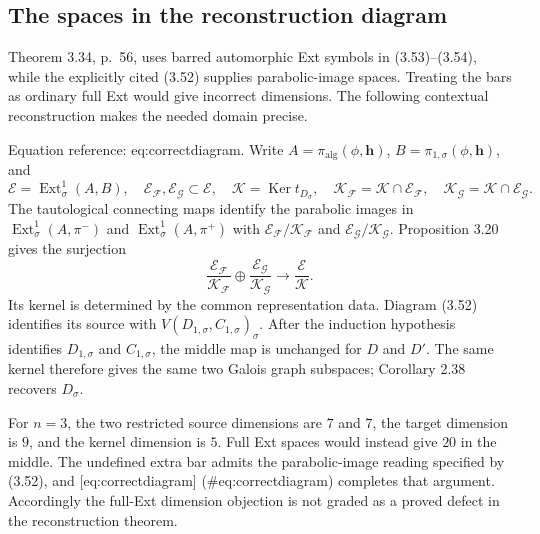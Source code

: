 \documentclass[10pt]{article}
\begin{document}
\subsection*{The spaces in the reconstruction diagram}
Theorem 3.34, p. 56, uses barred automorphic Ext symbols in (3.53)–(3.54), while the explicitly cited (3.52) supplies parabolic-image spaces. Treating the bars as ordinary full Ext would give incorrect dimensions. The following contextual reconstruction makes the needed domain precise.\par
Equation reference: eq:correctdiagram. Write \(A=\pi_{\mathrm{alg}}(\phi,\mathbf h)\), \(B=\pi_{1,\sigma}(\phi,\mathbf h)\), and \[\mathcal E=\operatorname{Ext}^1_\sigma(A,B),\quad
 \mathcal E_{\mathcal F},\mathcal E_{\mathcal G}\subset\mathcal E,\quad
 \mathcal K=\operatorname{Ker}t_{D_\sigma},\quad
 \mathcal K_{\mathcal F}=\mathcal K\cap\mathcal E_{\mathcal F},
 \quad
 \mathcal K_{\mathcal G}=\mathcal K\cap\mathcal E_{\mathcal G}.\] The tautological connecting maps identify the parabolic images in \(\operatorname{Ext}^1_\sigma(A,\pi^-)\) and \(\operatorname{Ext}^1_\sigma(A,\pi^+)\) with \(\mathcal E_{\mathcal F}/\mathcal K_{\mathcal F}\) and \(\mathcal E_{\mathcal G}/\mathcal K_{\mathcal G}\). Proposition 3.20 gives the surjection \[
 \frac{\mathcal E_{\mathcal F}}{\mathcal K_{\mathcal F}}
 \oplus
 \frac{\mathcal E_{\mathcal G}}{\mathcal K_{\mathcal G}}
 \longrightarrow\frac{\mathcal E}{\mathcal K}.\] Its kernel is determined by the common representation data. Diagram (3.52) identifies its source with \(V(D_{1,\sigma},C_{1,\sigma})_\sigma\). After the induction hypothesis identifies \(D_{1,\sigma}\) and \(C_{1,\sigma}\), the middle map is unchanged for \(D\) and \(D'\). The same kernel therefore gives the same two Galois graph subspaces; Corollary 2.38 recovers \(D_\sigma\).\par
For \(n=3\), the two restricted source dimensions are \(7\) and \(7\), the target dimension is \(9\), and the kernel dimension is \(5\). Full Ext spaces would instead give \(20\) in the middle. The undefined extra bar admits the parabolic-image reading specified by (3.52), and [eq:correctdiagram] (\#eq:correctdiagram) completes that argument. Accordingly the full-Ext dimension objection is not graded as a proved defect in the reconstruction theorem.\par
\end{document}
